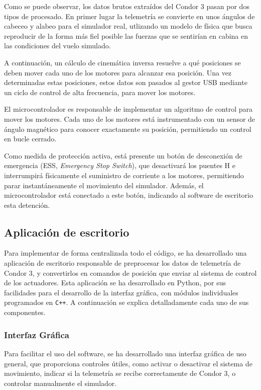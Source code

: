 \documentclass[sans]{cdvreport}
\begin{document}
Como se puede observar, los datos brutos extraídos del Condor 3 pasan por dos tipos de procesado. En primer lugar la telemetría se convierte en unos ángulos de cabeceo y alabeo para el simulador real, utlizando un modelo de física que busca reproducir de la forma más fiel posible las fuerzas que se sentirían en cabina en las condiciones del vuelo simulado.
\par A continuación, un cálculo de cinemática inversa resuelve a qué posiciones se deben mover cada uno de los motores para alcanzar esa posición. Una vez determinadas estas posiciones, estos datos son pasados al gestor USB mediante un ciclo de control de alta frecuencia, para mover los motores.
\par El microcontrolador es responsable de implementar un algoritmo de control  para mover los motores. Cada uno de los motores está instrumentado con un sensor de ángulo magnético para conocer exactamente su posición, permitiendo un control en bucle cerrado.
\par Como medida de protección activa, está presente un botón de desconexión de emergencia (ESS, \textit{Emergency Stop Switch}), que desactivará los puentes H e interrumpirá físicamente el suministro de corriente a los motores, permitiendo parar instantáneamente el movimiento del simulador. Además, el microcontrolador está conectado a este botón, indicando al software de escritorio esta detención.

\subsection{Aplicación de escritorio}
Para implementar de forma centralizada todo el código, se ha desarrollado una aplicación de escritorio responsable de preprocesar los datos de telemetría de Condor 3, y convertirlos en comandos de posición que enviar al sistema de control de los actuadores. Esta aplicación se ha desarrollado en Python, por sus facilidades para el desarrollo de la interfaz gráfica, con módulos individuales programados en \texttt{C++}. A continuación se explica detalladamente cada uno de sus componentes.

\subsubsection{Interfaz Gráfica}
Para facilitar el uso del software, se ha desarrollado una interfaz gráfica de uso general, que proporciona controles útiles, como activar o desactivar el sistema de movimiento, indicar si la telemetría se recibe correctamente de Condor 3, o controlar manualmente el simulador.
\end{document}
